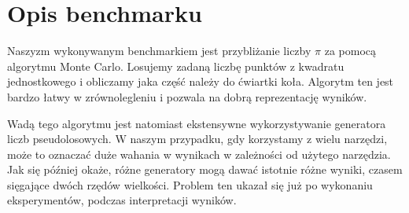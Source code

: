 \section{Opis benchmarku}

Naszyzm wykonywanym benchmarkiem jest przybliżanie liczby $\pi$ za pomocą
algorytmu Monte Carlo.
Losujemy zadaną liczbę punktów z kwadratu jednostkowego
i obliczamy jaka część należy do ćwiartki koła.
Algorytm ten jest bardzo łatwy w zrównolegleniu
i pozwala na dobrą reprezentację wyników.

Wadą tego algorytmu jest natomiast ekstensywne wykorzystywanie
generatora liczb pseudolosowych.
W naszym przypadku, gdy korzystamy z wielu narzędzi, może
to oznaczać duże wahania w wynikach w zależności od użytego narzędzia.
Jak się później okaże, różne generatory mogą dawać istotnie różne wyniki,
czasem sięgające dwóch rzędów wielkości.
Problem ten ukazał się już po wykonaniu eksperymentów,
podczas interpretacji wyników.

%
